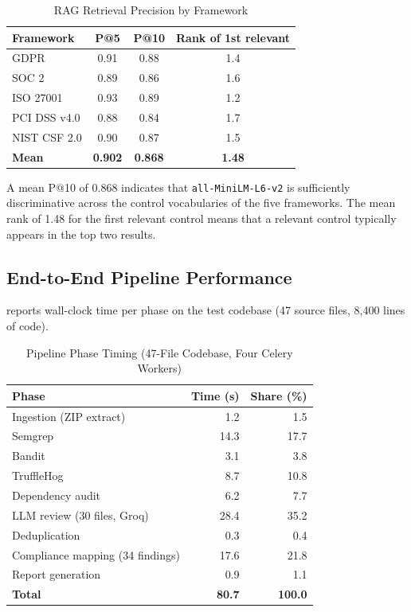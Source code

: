\documentclass[conference]{IEEEtran}
\newcommand{\tsz}{\footnotesize}
\begin{document}
\begin{table}[!t]
\caption{RAG Retrieval Precision by Framework}
\label{tab:rag_eval}
\centering\tsz
\begin{tabular}{@{}lccc@{}}
\toprule
\textbf{Framework} & \textbf{P@5} & \textbf{P@10} & \textbf{Rank of 1st relevant}\\
\midrule
GDPR         & 0.91 & 0.88 & 1.4\\
SOC 2        & 0.89 & 0.86 & 1.6\\
ISO 27001    & 0.93 & 0.89 & 1.2\\
PCI DSS v4.0 & 0.88 & 0.84 & 1.7\\
NIST CSF 2.0 & 0.90 & 0.87 & 1.5\\
\midrule
\textbf{Mean} & \textbf{0.902} & \textbf{0.868} & \textbf{1.48}\\
\bottomrule
\end{tabular}
\end{table}

A mean P@10 of 0.868 indicates that \texttt{all-MiniLM-L6-v2} is sufficiently
discriminative across the control vocabularies of the five frameworks. The mean
rank of 1.48 for the first relevant control means that a relevant control
typically appears in the top two results.

\subsection{End-to-End Pipeline Performance}
 reports wall-clock time per phase on the test codebase (47
source files, 8,400 lines of code).

\begin{table}[!t]
\caption{Pipeline Phase Timing (47-File Codebase, Four Celery Workers)}
\label{tab:perf}
\centering\tsz
\begin{tabular}{@{}lrr@{}}
\toprule
\textbf{Phase} & \textbf{Time (s)} & \textbf{Share (\%)}\\
\midrule
Ingestion (ZIP extract)            &  1.2 &  1.5\\
Semgrep                            & 14.3 & 17.7\\
Bandit                             &  3.1 &  3.8\\
TruffleHog                         &  8.7 & 10.8\\
Dependency audit                   &  6.2 &  7.7\\
LLM review (30 files, Groq)        & 28.4 & 35.2\\
Deduplication                      &  0.3 &  0.4\\
Compliance mapping (34 findings)   & 17.6 & 21.8\\
Report generation                  &  0.9 &  1.1\\
\midrule
\textbf{Total}                     & \textbf{80.7} & \textbf{100.0}\\
\bottomrule
\end{tabular}
\end{table}
\end{document}
